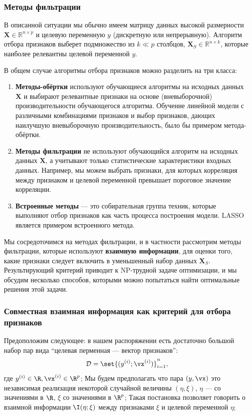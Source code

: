 \subsubsection{Методы фильтрации}
В описанной ситуации мы обычно имеем матрицу данных высокой размерности $\textbf{X} \in \mathbb{R}^{n \times p}$ и целевую переменную $y$ (дискретную или непрерывную). Алгоритм отбора признаков выберет подмножество из $k \ll p$ столбцов, $\textbf{X}_S \in \mathbb{R}^{n \times k}$, которые наиболее релевантны целевой переменной $y$.

В общем случае алгоритмы отбора признаков можно разделить на три класса:
\begin{enumerate}[compact]
	\item \textbf{Методы-обёртки} используют обучающиеся алгоритмы на исходных данных $\textbf{X}$ и выбирают релевантные признаки на основе (вневыборочной) производительности обучающегося алгоритма. Обучение линейной модели с различными комбинациями признаков и выбор признаков, дающих наилучшую вневыборочную производительность, было бы примером метода-обёртки.
	\item \textbf{Методы фильтрации} не используют обучающийся алгоритм на исходных данных $\textbf{X}$, а учитывают только статистические характеристики входных данных. Например, мы можем выбрать признаки, для которых корреляция между признаком и целевой переменной превышает пороговое значение корреляции.
	\item \textbf{Встроенные методы} — это собирательная группа техник, которые выполняют отбор признаков как часть процесса построения модели. LASSO является примером встроенного метода.
\end{enumerate}

Мы сосредоточимся на методах фильтрации, и в частности рассмотрим методы фильтрации, которые используют \textbf{взаимную информации}, для оценки того, какие признаки следует включить в уменьшенный набор данных $\textbf{X}_S$. Результирующий критерий приводит к NP-трудной задаче оптимизации, и мы обсудим несколько способов, которыми можно попытаться найти оптимальные решения этой задачи.

\subsubsection{Совместная взаимная информация как критерий для отбора признаков}

Предоположим следующее: в нашем распоряжении есть достаточно большой набор пар вида \enquote{целевая перменная --- вектор признаков}:
$$
	\mathcal{D} = \set{(y^{(i)}; \vx^{(i)})}_{i = 1}^{n},
$$
где $y^{(i)} \in \R, \vx^{(i)} \in \R^p$; Мы будем предполагать что пара $(y, \vx)$ это независимая реализация некоторой случайной величины $(\eta, \xi)$, $\eta$ --- со значениями в $\R$, $\xi$ со значениями в $\R^p$; Такая постановка позволяет говорить о взаимной информации $\I(\eta; \xi)$ между признаками $\xi$ и целевой переменной $\eta$;

